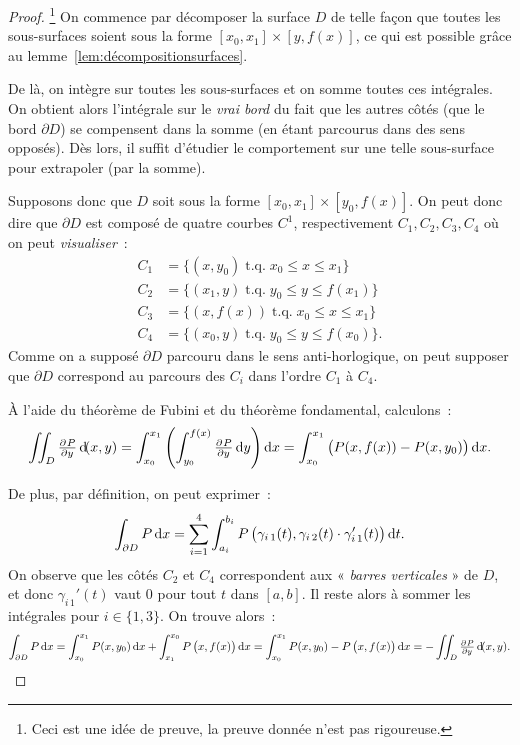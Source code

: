 \documentclass{article}
\DeclareMathOperator{\tq}{ t.q. }
\theoremstyle{definition}
\theoremstyle{remark}
\begin{document}
		\begin{proof}\footnote{Ceci est une idée de preuve, la preuve donnée n'est pas rigoureuse.} On commence par décomposer la surface $D$ de telle façon que
		toutes les sous-surfaces soient sous la forme $[x_0, x_1] \times [y, f(x)]$, ce qui est possible grâce au lemme~\ref{lem:décompositionsurfaces}.

		De là, on intègre sur toutes les sous-surfaces et on somme toutes ces intégrales. On obtient alors l'intégrale sur le \emph{vrai bord} du fait que les
		autres côtés (que le bord $\partial D$) se compensent dans la somme (en étant parcourus dans des sens opposés). Dès lors, il suffit d'étudier le
		comportement sur une telle sous-surface pour extrapoler (par la somme).

		Supposons donc que $D$ soit sous la forme $[x_0, x_1] \times [y_0, f(x)]$. On peut donc dire que $\partial D$ est composé de quatre courbes $C^1$,
		respectivement $C_1, C_2, C_3, C_4$ où on peut \emph{visualiser}~:
		\begin{align*}
			C_1 &= \{(x, y_0) \tq x_0 \leq x \leq x_1\} \\
			C_2 &= \{(x_1, y) \tq y_0 \leq y \leq f(x_1)\} \\
			C_3 &= \{(x, f(x)) \tq x_0 \leq x \leq x_1\} \\
			C_4 &= \{(x_0, y) \tq y_0 \leq y \leq f(x_0)\}.
		\end{align*}
		Comme on a supposé $\partial D$ parcouru dans le sens anti-horlogique, on peut supposer que $\partial D$ correspond au parcours des $C_i$ dans l'ordre
		$C_1$ à $C_4$.

		À l'aide du théorème de Fubini et du théorème fondamental, calculons~:
		\[\iint_D\pd Py\dif (x, y) = \int_{x_0}^{x_1}\left(\int_{y_0}^{f(x)}\pd Py\dif y\right)\dif x
		= \int_{x_0}^{x_1}\left(P(x, f(x)) - P(x, y_0)\right)\dif x.\]

		De plus, par définition, on peut exprimer~:
		\[\int_{\partial D}P\dif x = \sum_{i=1}^4\int_{a_i}^{b_i}P\left(\gamma_{i\,1}(t), \gamma_{i\,2}(t) \cdot \gamma_{i\,1}'(t)\right)\dif t.\]
		On observe que les côtés $C_2$ et $C_4$ correspondent aux « \emph{barres verticales} » de $D$, et donc $\gamma_{i\,1}'(t)$ vaut 0 pour tout $t$ dans
		$[a, b]$. Il reste alors à sommer les intégrales pour $i \in \{1, 3\}$. On trouve alors~:
		\[\int_{\partial D}P\dif x = \int_{x_0}^{x_1}P(x, y_0)\dif x + \int_{x_1}^{x_0}P\left(x, f(x)\right)\dif x
		= \int_{x_0}^{x_1}P(x, y_0) - P\left(x, f(x)\right)\dif x = -\iint_D\pd Py\dif (x, y).\]


\end{proof}
\end{document}
